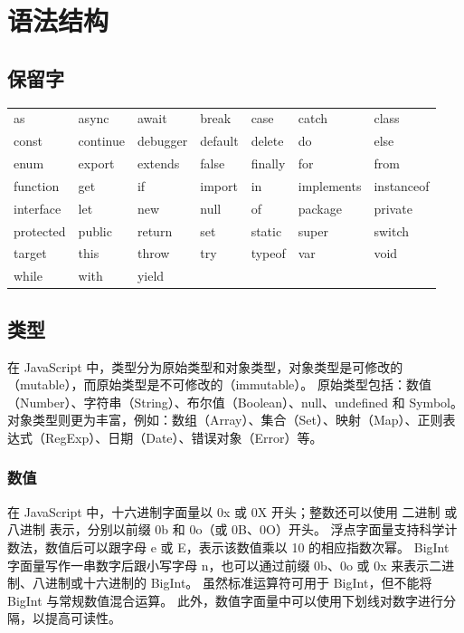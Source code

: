 \section{语法结构}
\subsection{保留字}
\begin{tabular}{lllllll}
	as        & async    & await    & break   & case    & catch      & class      \\
	const     & continue & debugger & default & delete  & do         & else       \\
	enum      & export   & extends  & false   & finally & for        & from       \\
	function  & get      & if       & import  & in      & implements & instanceof \\
	interface & let      & new      & null    & of      & package    & private    \\
	protected & public   & return   & set     & static  & super      & switch     \\
	target    & this     & throw    & try     & typeof  & var        & void       \\
	while     & with     & yield                                                  \\
\end{tabular}

\subsection{类型}
在 JavaScript 中，类型分为原始类型和对象类型，对象类型是可修改的（mutable），而原始类型是不可修改的（immutable）。
原始类型包括：数值（Number）、字符串（String）、布尔值（Boolean）、null、undefined 和 Symbol。
对象类型则更为丰富，例如：数组（Array）、集合（Set）、映射（Map）、正则表达式（RegExp）、日期（Date）、错误对象（Error）等。

\subsubsection{数值}
在 JavaScript 中，十六进制字面量以 0x 或 0X 开头；整数还可以使用 二进制 或 八进制 表示，分别以前缀 0b 和 0o（或 0B、0O）开头。
浮点字面量支持科学计数法，数值后可以跟字母 e 或 E，表示该数值乘以 10 的相应指数次幂。
BigInt 字面量写作一串数字后跟小写字母 n，也可以通过前缀 0b、0o 或 0x 来表示二进制、八进制或十六进制的 BigInt。
虽然标准运算符可用于 BigInt，但不能将 BigInt 与常规数值混合运算。
此外，数值字面量中可以使用下划线对数字进行分隔，以提高可读性。

